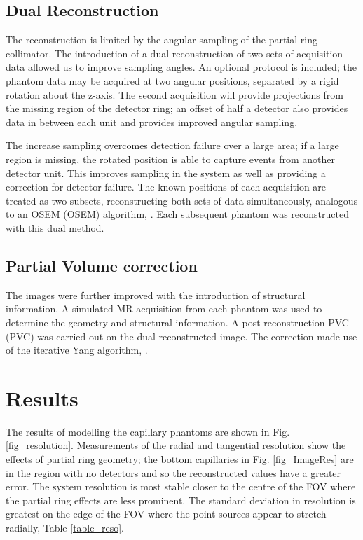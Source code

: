 \subsection{Dual Reconstruction}
The reconstruction is limited by the angular sampling of the partial ring collimator. The introduction of a dual reconstruction of two sets of acquisition data allowed us to improve sampling angles. An optional protocol is included; the phantom data may be acquired at two angular positions, separated by a rigid rotation about the z-axis. The second acquisition will provide projections from the missing region of the detector ring; an offset of half a detector also provides data in between each unit and provides improved angular sampling. 

The increase sampling overcomes detection failure over a large area; if a large region is missing, the rotated position is able to capture events from another detector unit. This improves sampling in the system as well as providing a correction for detector failure. The known positions of each acquisition are treated as two subsets, reconstructing both sets of data simultaneously, analogous to an \acrlong{OSEM} (\acrshort{OSEM}) algorithm, \cite{363108}. Each subsequent phantom was reconstructed with this dual method.

\subsection{Partial Volume correction} 
The images were further improved with the introduction of structural information. A simulated \acrshort{MR} acquisition from each phantom was used to determine the geometry and structural information. A post reconstruction \acrlong{PVC} (\acrshort{PVC}) was carried out on the dual reconstructed image. The correction made use of the iterative Yang algorithm, \cite{Erlandsson2012AOncology.}.

\section{Results}
  The results of modelling the capillary phantoms are shown in Fig. \ref{fig_resolution}. Measurements of the radial and tangential resolution show the effects of partial ring geometry; the bottom capillaries in Fig. \ref{fig_ImageRes} are in the region with no detectors and so the reconstructed values have a greater error. The system resolution is most stable closer to the centre of the \acrshort{FOV} where the partial ring effects are less prominent. The standard deviation in resolution is greatest on the edge of the FOV where the point sources appear to stretch radially, Table \ref{table_reso}.
  
